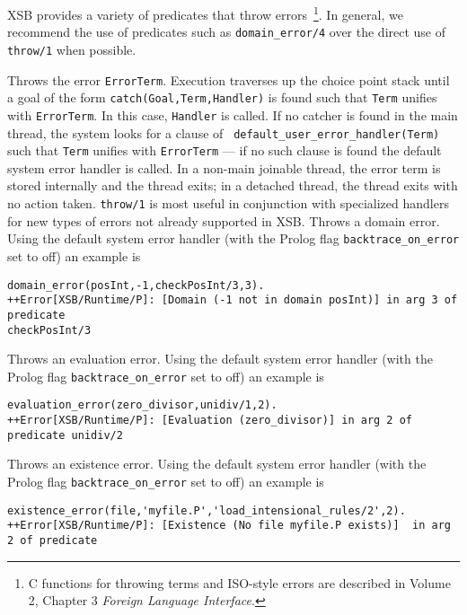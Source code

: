 XSB provides a variety of predicates that throw errors~\footnote{C
  functions for throwing terms and ISO-style errors are described in
  Volume 2, Chapter 3 {\em Foreign Language Interface}.}. In general,
we recommend the use of predicates such as {\tt domain\_error/4} over
the direct use of {\tt throw/1} when possible.
%
\begin{description}
%
Throws the error {\tt ErrorTerm}.  Execution traverses up the choice
point stack until a goal of the form {\tt catch(Goal,Term,Handler)} is
found such that {\tt Term} unifies with {\tt ErrorTerm}.  In this
case, {\tt Handler} is called.  If no catcher is found in the main
thread, the system looks for a clause of {\tt
  default\_user\_error\_handler(Term)} such that {\tt Term} unifies
with {\tt ErrorTerm} --- if no such clause is found the default system
error handler is called.  In a non-main joinable thread, the error
term is stored internally and the thread exits; in a detached thread,
the thread exits with no action taken.  {\tt throw/1} is most useful
in conjunction with specialized handlers for new types of errors not
already supported in XSB.  
%
%
Throws a domain error.  Using the default system error handler (with
the Prolog flag {\tt backtrace\_on\_error} set to off) an example is
{\small
\begin{verbatim}
domain_error(posInt,-1,checkPosInt/3,3).
++Error[XSB/Runtime/P]: [Domain (-1 not in domain posInt)] in arg 3 of predicate 
checkPosInt/3
\end{verbatim} }
%
%
Throws an evaluation error.  Using the default system error handler
(with the Prolog flag {\tt backtrace\_on\_error} set to off) an
example is {\small
\begin{verbatim}
evaluation_error(zero_divisor,unidiv/1,2).
++Error[XSB/Runtime/P]: [Evaluation (zero_divisor)] in arg 2 of predicate unidiv/2
\end{verbatim} }
%
%
Throws an existence error.  Using the default system error handler
(with the Prolog flag {\tt backtrace\_on\_error} set to off) an
example is {\small
\begin{verbatim}
existence_error(file,'myfile.P','load_intensional_rules/2',2).
++Error[XSB/Runtime/P]: [Existence (No file myfile.P exists)]  in arg 2 of predicate 

\end{verbatim}}
\end{description}
